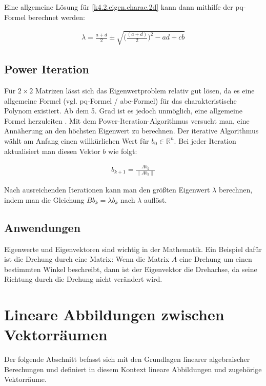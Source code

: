 \documentclass[]{dsadokumentation}
\begin{document}
Eine allgemeine Lösung für \cref{k4.2.eigen.charac.2d} kann dann mithilfe der pq-Formel berechnet werden:

\begin{equation}
  \begin{aligned}
    \lambda = \frac{a+d}{2} \pm \sqrt{\Big(\frac{(a+d)}{2}\Big)^2-ad+cb}
  \end{aligned}
\end{equation}


\subsection{Power Iteration}\label{k4.2.eigen.powerit}

Für $2 \times 2$ Matrizen lässt sich das Eigenwertproblem relativ gut lösen, da es eine allgemeine Formel (vgl. pq-Formel / abc-Formel) für das charakteristische Polynom existiert. Ab dem 5. Grad ist es jedoch unmöglich, eine allgemeine Formel herzuleiten \parencite{k4.2.ramond}. %
Mit dem Power-Iteration-Algorithmus versucht man, eine Annäherung an den höchsten Eigenwert zu berechnen. Der iterative Algorithmus wählt am Anfang einen willkürlichen Wert für $b_0 \in \mathbb{R}^n$. Bei jeder Iteration aktualisiert man diesen Vektor $b$ wie folgt:

\begin{equation}
  \begin{aligned}
    b_{k+1} = \frac{Ab_k}{\left\lVert Ab_k \right\rVert }
  \end{aligned}
\end{equation}

Nach ausreichenden Iterationen kann man den größten Eigenwert $\lambda$ berechnen, indem man die Gleichung $B b_{k} = \lambda b_{k}$ nach $\lambda$ auflöst.

\subsection{Anwendungen}

Eigenwerte und Eigenvektoren sind wichtig in der Mathematik. Ein Beispiel dafür ist die Drehung durch eine Matrix: Wenn die Matrix $A$ eine Drehung um einen bestimmten Winkel beschreibt, dann ist der Eigenvektor die Drehachse, da seine Richtung durch die Drehung nicht verändert wird.



\section{Lineare Abbildungen zwischen Vektorräumen}\label{k4.2.ch.linalg}
Der folgende Abschnitt befasst sich mit den Grundlagen linearer algebraischer Berechungen und definiert in diesem Kontext lineare Abbildungen und zugehörige Vektorräume.
\end{document}
